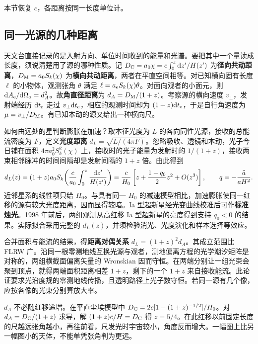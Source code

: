 本节恢复 $c$，各距离按同一长度单位计。

\subsection{同一光源的几种距离}

天文台直接记录的是入射方向、单位时间收到的能量和光谱。要把其中一个量读成长度，须说清楚用了源的哪种性质。记 $D_{\rm C}=a_0\chi=c\int_0^z\dd z'/H(z')$ 为\textbf{径向共动距离}，$D_{\rm M}=a_0 S_k(\chi)$ 为\textbf{横向共动距离}，两者在平直空间相等。对已知横向固有长度 $\ell$ 的小物体，观测张角 $\theta$ 满足 $\ell=a_{\rm e}S_k(\chi)\theta$。对面向观者的小面元，则 $\dd A_{\rm e}/\dd\Omega_{\rm o}=d_A^2$。故\textbf{角直径距离}为 $d_A=D_{\rm M}/(1+z)$。考察源的横向速度 $v_\perp$，发射端经历 $\dd t_{\rm e}$ 走过 $v_\perp\dd t_{\rm e}$，相应的观测时间却为 $(1+z)\dd t_{\rm e}$，于是自行角速度为 $\mu=v_\perp/D_{\rm M}$。有已知本动的源又给出一种横向尺。

如何由远处的星判断膨胀在加速？取本征光度为 $L$ 的各向同性光源，接收的总能流密度为 $F$，定义\textbf{光度距离} $d_L=\sqrt{L/(4\pi F)}$。忽略吸收、透镜和本动，光子今日铺在面积 $4\pi a_0^2 S_k^2(\chi)$ 上，接收时的光子能量为发射时的 $1/(1+z)$，接收两束相邻脉冲的时间间隔却是发射间隔的 $1+z$ 倍。由此得到
\begin{equation}\label{eq:cosmo-lumdist}
 d_L(z)=(1+z)a_0 S_k\!\left(\frac{c}{a_0}\int_0^z\frac{\dd z'}{H(z')}\right)
 =\frac{c}{H_0}\left[z+\frac{1-q_0}{2}z^2+O(z^3)\right],
 \qquad q=-\frac{\ddot a}{aH^2}.
\end{equation}
近邻星系的线性项只给 $H_0$。与具有同一 $H_0$ 的减速模型相比，加速膨胀使同一红移的源有较大光度距离，因而显得较暗。Ia 型超新星经光变曲线校准后可作\textbf{标准烛光}。1998 年前后，两组观测从高红移 Ia 型超新星的亮度得到支持 $q_0<0$ 的结果。实际拟合采用完整的 $d_L(z)$，并须检验消光、光度演化和样本选择等效应。



合并面积与能流的结果，得\textbf{距离对偶关系} $d_L=(1+z)^2d_A$。其成立范围比 FLRW 广。沿同一根零测地线互换光源与观者，测地偏离方程的光学潮汐矩阵是对称的，两组横截面偏离矢量的 Wronskian 因而守恒。在两端分别让一组光束会聚到顶点，就得两端面积距离相差 $1+z$，剩下的一个 $1+z$ 来自接收能流。此论证要求光沿度规的零测地线传播，且透明路径上光子数守恒。若同一源有几个像，应按各像的光束分别算放大率。

$d_A$ 不必随红移递增。在平直尘埃模型中 $D_{\rm C}=2c[1-(1+z)^{-1/2}]/H_0$。对 $d_A=D_{\rm C}/(1+z)$ 求导，解 $(1+z)c/H=D_{\rm C}$ 得 $z=5/4$。在此红移以前固定长度的尺越远张角越小，再往前看，尺发光时宇宙较小，角度反而增大。一幅图上比另一幅图小的天体，不能单凭张角判为更远。


